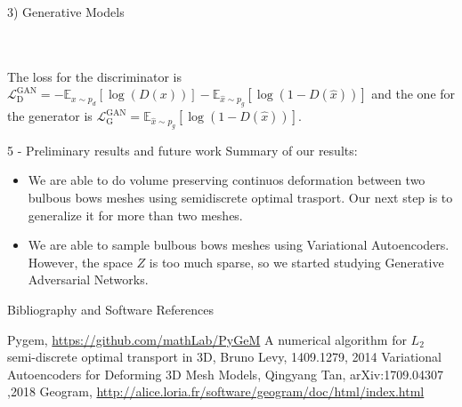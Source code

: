 \documentclass[b0paper,portrait]{baposter}
\begin{document}
\begin{poster}
\begin{posterbox}[name=vae,below=otm,span=6,column=0]{3) Generative Models }
\begin{itemize}
 \\
\null \\
The loss for the discriminator is $ 
 \mathcal{L}_{\mathrm{D}}^{\mathrm{GAN}}=-\mathbb{E}_{x \sim p_{d}}[\log (D(x))]-\mathbb{E}_{\hat{x} \sim p_{g}}[\log (1-D(\hat{x}))]$ and the one for the generator is $\mathcal{L}_{\mathrm{G}}^{\mathrm{GAN}}=\mathbb{E}_{\hat{x} \sim p_{g}}[\log (1-D(\hat{x}))]$.
\end{itemize}
\end{posterbox}
\begin{posterbox}[name=results,below=vae,span=6,column=0]{5
    - Preliminary results and future work}
Summary of our results:
\begin{itemize}
\item We are able to do volume preserving continuos deformation between two bulbous bows meshes using semidiscrete optimal trasport. Our next step is to generalize it for more than two meshes.
\item We are able to sample bulbous bows meshes using Variational Autoencoders. However, the space $Z$ is too much sparse, so we started studying Generative Adversarial Networks. 
\end{itemize}
\end{posterbox}
\begin{posterbox}[name=bibliography,below=results,span=6,column=0]{Bibliography and Software References}
\begingroup
\renewcommand{\section}[2]{}%
\begin{thebibliography}{9}
Pygem, \url{https://github.com/mathLab/PyGeM}
A numerical algorithm for $L_{2}$ semi-discrete optimal transport in 3D, Bruno Levy, 1409.1279, 2014
Variational Autoencoders for Deforming 3D Mesh Models, Qingyang Tan, arXiv:1709.04307 ,2018
Geogram, \url{http://alice.loria.fr/software/geogram/doc/html/index.html}
\end{thebibliography}
\endgroup
\end{posterbox}

\end{poster}
\end{document}
